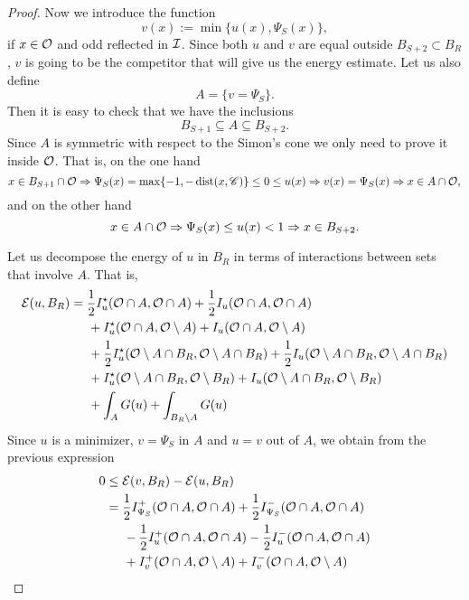 \begin{proof}
Now we introduce the function
$$ v(x) := \min\{u(x),\Psi_S(x)\}, $$
if $x\in \mathcal{O}$ and odd reflected in $\mathcal{I}$. Since both $u$ and $v$ are equal outside $B_{S+2} \subset B_R$, $v$ is going to be the competitor that will give us the energy estimate. Let us also define
$$ A = \{v=\Psi_S\}. $$ 
Then it is easy to check that we have the inclusions
$$ B_{S+1} \subseteq A \subseteq B_{S+2}. $$
Since $A$ is symmetric with respect to the Simon's cone we only need to prove it inside $\mathcal{O}$. That is, on the one hand
$$ x\in B_{S+1}\cap \mathcal{O} \Rightarrow \Psi_S(x) = \max\{-1,-\operatorname{dist}(x,\mathscr{C})\} \leq 0 \leq u(x) \Rightarrow v(x) = \Psi_S(x)  \Rightarrow x\in A\cap \mathcal{O},  $$
and on the other hand
$$ x\in A\cap \mathcal{O} \Rightarrow \Psi_S(x) \leq u(x) < 1 \Rightarrow x\in B_{S+2}.  $$

Let us decompose the energy of $u$ in $B_R$ in terms of interactions between sets that involve $A$. That is,
\begin{align*}
\mathcal{E}(u,B_R) &= \frac{1}{2}I_u^\star(\mathcal{O} \cap A, \mathcal{O} \cap A) + \frac{1}{2}I_u(\mathcal{O} \cap A, \mathcal{O} \cap A)\\
& \hspace{5mm} + I_u^\star(\mathcal{O} \cap A, \mathcal{O} \setminus A) + I_u(\mathcal{O} \cap A, \mathcal{O} \setminus A) \\
& \hspace{5mm} + \frac{1}{2}I_u^\star(\mathcal{O} \setminus A \cap B_R, \mathcal{O} \setminus A \cap B_R) + \frac{1}{2}I_u(\mathcal{O} \setminus A \cap B_R, \mathcal{O} \setminus A \cap B_R)\\
& \hspace{5mm} + I_u^\star(\mathcal{O} \setminus A \cap B_R, \mathcal{O} \setminus B_R) + I_u(\mathcal{O} \setminus A \cap B_R, \mathcal{O} \setminus B_R) \\
& \hspace{5mm} + \int_A G(u) + \int_{B_R\setminus A} G(u)
\end{align*}
Since $u$ is a minimizer, $v=\Psi_S$ in $A$ and $u=v$ out of $A$, we obtain from the previous expression
\begin{align*}
0 &\leq \ecal(v,B_R)-\ecal(u,B_R)\\
&= \frac{1}{2}I_{\Psi_S}^+(\ocal \cap A, \ocal \cap A) + \frac{1}{2}I_{\Psi_S}^-(\ocal \cap A, \ocal \cap A)\\
& \hspace{5mm} -\frac{1}{2}I_u^+(\ocal \cap A, \ocal \cap A) - \frac{1}{2}I_u^-(\ocal \cap A, \ocal \cap A)\\
& \hspace{5mm} + I_v^+(\ocal \cap A, \ocal \setminus A) + I_v^-(\ocal \cap A, \ocal \setminus A) \\

\end{align*}
\end{proof}
